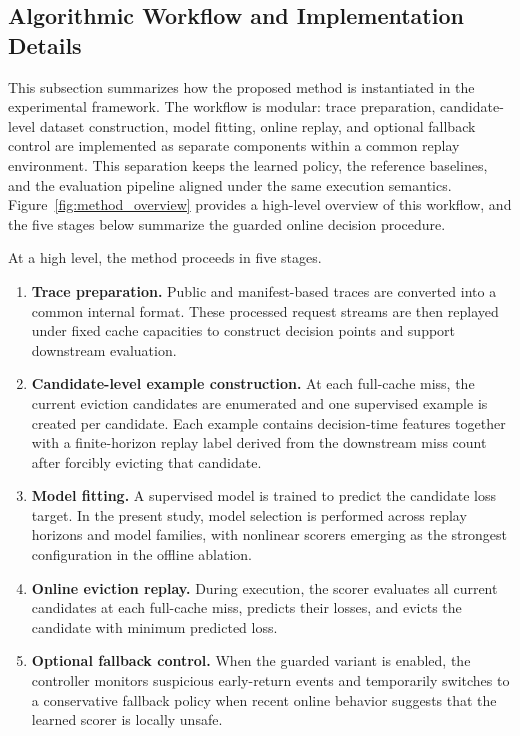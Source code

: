 \documentclass[preprint,12pt]{elsarticle}
\begin{document}
\subsection{Algorithmic Workflow and Implementation Details}
\label{subsec:workflow_implementation}

This subsection summarizes how the proposed method is instantiated in the experimental framework. The workflow is modular: trace preparation, candidate-level dataset construction, model fitting, online replay, and optional fallback control are implemented as separate components within a common replay environment. This separation keeps the learned policy, the reference baselines, and the evaluation pipeline aligned under the same execution semantics. Figure~\ref{fig:method_overview} provides a high-level overview of this workflow, and the five stages below summarize the guarded online decision procedure.

At a high level, the method proceeds in five stages.

\begin{enumerate}
    \item \textbf{Trace preparation.}
    Public and manifest-based traces are converted into a common internal format. These processed request streams are then replayed under fixed cache capacities to construct decision points and support downstream evaluation.

    \item \textbf{Candidate-level example construction.}
    At each full-cache miss, the current eviction candidates are enumerated and one supervised example is created per candidate. Each example contains decision-time features together with a finite-horizon replay label derived from the downstream miss count after forcibly evicting that candidate.

    \item \textbf{Model fitting.}
    A supervised model is trained to predict the candidate loss target. In the present study, model selection is performed across replay horizons and model families, with nonlinear scorers emerging as the strongest configuration in the offline ablation.

    \item \textbf{Online eviction replay.}
    During execution, the scorer evaluates all current candidates at each full-cache miss, predicts their losses, and evicts the candidate with minimum predicted loss.

    \item \textbf{Optional fallback control.}
    When the guarded variant is enabled, the controller monitors suspicious early-return events and temporarily switches to a conservative fallback policy when recent online behavior suggests that the learned scorer is locally unsafe.
\end{enumerate}
\end{document}
